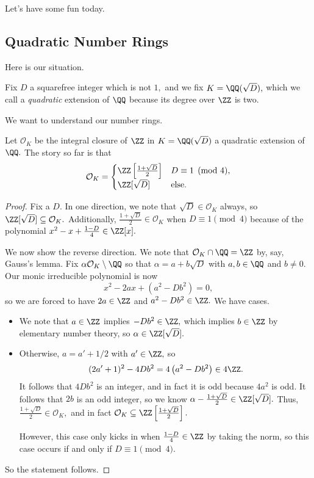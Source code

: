 \documentclass[../notes.tex]{subfiles}
\begin{document}
Let's have some fun today.

\subsection{Quadratic Number Rings}
Here is our situation.
\begin{defi}
    Fix $D$ a squarefree integer which is not $1,$ and we fix $K=\QQ(\sqrt D),$ which we call a \textit{quadratic} extension of $\QQ$ because its degree over $\ZZ$ is two.
\end{defi}
We want to understand our number rings.
\begin{prop}
    Let $\mathcal O_K$ be the integral closure of $\ZZ$ in $K=\QQ(\sqrt D)$ a quadratic extension of $\QQ.$ The story so far is that
    \[\mathcal O_K=\begin{cases}
        \ZZ\left[\frac{1+\sqrt D}2\right] & D\equiv1\pmod4, \\
        \ZZ[\sqrt D] & \text{else}.
    \end{cases}\]
\end{prop}
\begin{proof}
    Fix a $D.$ In one direction, we note that $\sqrt D\in\mathcal O_K$ always, so $\ZZ[\sqrt D]\subseteq\mathcal O_K.$ Additionally, $\frac{1+\sqrt D}2\in\mathcal O_K$ when $D\equiv1\pmod4$ because of the polynomial $x^2-x+\frac{1-D}4\in\ZZ[x].$
    
    We now show the reverse direction. We note that $\mathcal O_K\cap\QQ=\ZZ$ by, say, Gauss's lemma. Fix $\alpha\mathcal O_K\setminus\QQ$ so that $\alpha=a+b\sqrt D$ with $a,b\in\QQ$ and $b\ne0.$ Our monic irreducible polynomial is now
    \[x^2-2ax+\left(a^2-Db^2\right)=0,\]
    \todo{}so we are forced to have $2a\in\ZZ$ and $a^2-Db^2\in\ZZ.$ We have cases.
    \begin{itemize}
        \item We note that $a\in\ZZ$ implies $-Db^2\in\ZZ,$ which implies $b\in\ZZ$ by elementary number theory, so $\alpha\in\ZZ[\sqrt D].$
        \item Otherwise, $a=a'+1/2$ with $a'\in\ZZ,$ so
        \[(2a'+1)^2-4Db^2=4\left(a^2-Db^2\right)\in4\ZZ.\]
        It follows that $4Db^2$ is an integer, and in fact it is odd because $4a^2$ is odd. It follows that $2b$ is an odd integer, so we know $\alpha-\frac{1+\sqrt D}2\in\ZZ[\sqrt D].$ Thus, $\frac{1+\sqrt D}2\in\mathcal O_K,$ and in fact $\mathcal O_K\subseteq\ZZ\left[\frac{1+\sqrt D}2\right].$
        
        However, this case only kicks in when $\frac{1-D}4\in\ZZ$ by taking the norm, so this case occurs if and only if $D\equiv1\pmod4.$
    \end{itemize}
    So the statement follows.
\end{proof}
\end{document}
